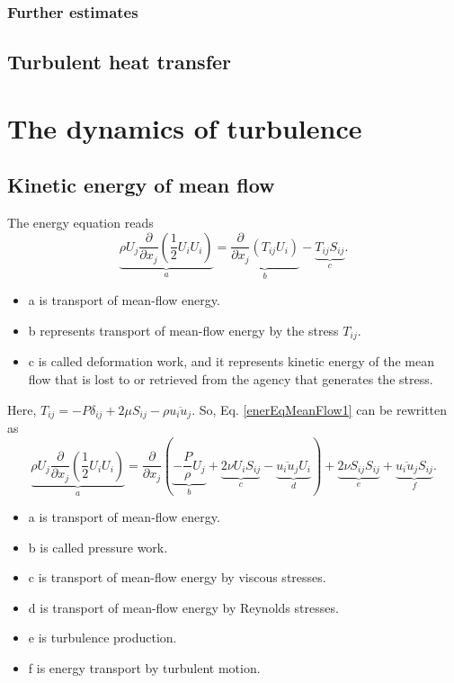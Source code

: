 \documentclass[review]{elsarticle}
\begin{document}
	\subsubsection{Further estimates}
	\subsection{Turbulent heat transfer}

\section{The dynamics of turbulence}
	\subsection{Kinetic energy of mean flow}
		The energy equation reads
		\begin{equation}\label{enerEqMeanFlow1}
			\underbrace {\rho U_j\frac{\partial}{\partial x_j}(\frac{1}{2}U_iU_i)}_{a}=\underbrace {\frac{\partial}{\partial x_j}(T_{ij}U_i)}_{b} 
			- \underbrace {T_{ij}S_{ij}}_{c}.
		\end{equation}
		\begin{itemize}
			\item a is transport of mean-flow energy.
			\item b represents transport of mean-flow energy by the stress $T_{ij}$. 
			\item c is called deformation work, and it represents kinetic energy of the mean flow that is lost to or retrieved from the agency 
			that generates the stress.
		\end{itemize}
		Here, $T_{ij} = -P\delta_{ij}+2\mu S_{ij} - \rho \overline{u_iu_j}$. So, Eq. \ref{enerEqMeanFlow1} can be rewritten as 
		\begin{equation}\label{enerEqMeanFlow2}
			\underbrace {\rho U_j\frac{\partial}{\partial x_j}(\frac{1}{2}U_iU_i)}_{a}=
			\frac{\partial}{\partial x_j}(
				\underbrace{-\frac{P}{\rho}U_j}_b + 
				\underbrace{2\nu U_iS_{ij}}_c - 
				\underbrace{\overline{u_iu_j}U_i}_d
			) +	\underbrace {2\nu S_{ij}S_{ij}}_{e} + \underbrace{\overline{u_iu_j}S_{ij}}_f. 
		\end{equation}
		\begin{itemize}
			\item a is transport of mean-flow energy.
			\item b is called pressure work.
			\item c is transport of mean-flow energy by viscous stresses.
			\item d is transport of mean-flow energy by Reynolds stresses.
			\item e is turbulence production.
			\item f is energy transport by turbulent motion.
		\end{itemize}
\end{document}
